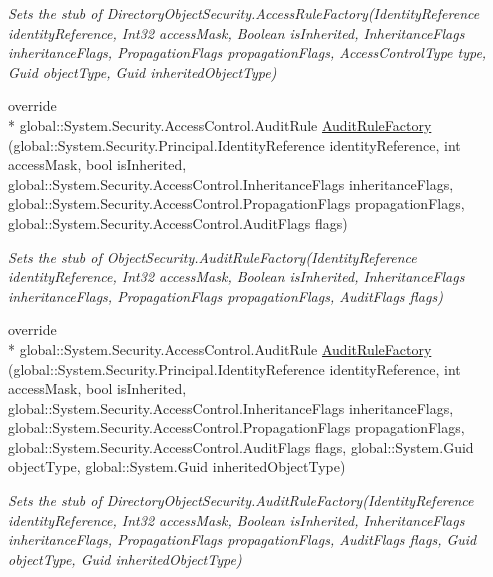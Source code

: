 \begin{DoxyCompactItemize}
\begin{DoxyCompactList}\small\item\em Sets the stub of Directory\-Object\-Security.\-Access\-Rule\-Factory(\-Identity\-Reference identity\-Reference, Int32 access\-Mask, Boolean is\-Inherited, Inheritance\-Flags inheritance\-Flags, Propagation\-Flags propagation\-Flags, Access\-Control\-Type type, Guid object\-Type, Guid inherited\-Object\-Type)\end{DoxyCompactList}\item 
override \\*
global\-::\-System.\-Security.\-Access\-Control.\-Audit\-Rule \hyperlink{class_system_1_1_security_1_1_access_control_1_1_fakes_1_1_stub_directory_object_security_a86aa0b73265887b1662ab7c36cec7357}{Audit\-Rule\-Factory} (global\-::\-System.\-Security.\-Principal.\-Identity\-Reference identity\-Reference, int access\-Mask, bool is\-Inherited, global\-::\-System.\-Security.\-Access\-Control.\-Inheritance\-Flags inheritance\-Flags, global\-::\-System.\-Security.\-Access\-Control.\-Propagation\-Flags propagation\-Flags, global\-::\-System.\-Security.\-Access\-Control.\-Audit\-Flags flags)
\begin{DoxyCompactList}\small\item\em Sets the stub of Object\-Security.\-Audit\-Rule\-Factory(\-Identity\-Reference identity\-Reference, Int32 access\-Mask, Boolean is\-Inherited, Inheritance\-Flags inheritance\-Flags, Propagation\-Flags propagation\-Flags, Audit\-Flags flags)\end{DoxyCompactList}\item 
override \\*
global\-::\-System.\-Security.\-Access\-Control.\-Audit\-Rule \hyperlink{class_system_1_1_security_1_1_access_control_1_1_fakes_1_1_stub_directory_object_security_a2d8519279efe8cb61d5ff2fdd3a7db51}{Audit\-Rule\-Factory} (global\-::\-System.\-Security.\-Principal.\-Identity\-Reference identity\-Reference, int access\-Mask, bool is\-Inherited, global\-::\-System.\-Security.\-Access\-Control.\-Inheritance\-Flags inheritance\-Flags, global\-::\-System.\-Security.\-Access\-Control.\-Propagation\-Flags propagation\-Flags, global\-::\-System.\-Security.\-Access\-Control.\-Audit\-Flags flags, global\-::\-System.\-Guid object\-Type, global\-::\-System.\-Guid inherited\-Object\-Type)
\begin{DoxyCompactList}\small\item\em Sets the stub of Directory\-Object\-Security.\-Audit\-Rule\-Factory(\-Identity\-Reference identity\-Reference, Int32 access\-Mask, Boolean is\-Inherited, Inheritance\-Flags inheritance\-Flags, Propagation\-Flags propagation\-Flags, Audit\-Flags flags, Guid object\-Type, Guid inherited\-Object\-Type)\end{DoxyCompactList}\item 

\end{DoxyCompactItemize}
